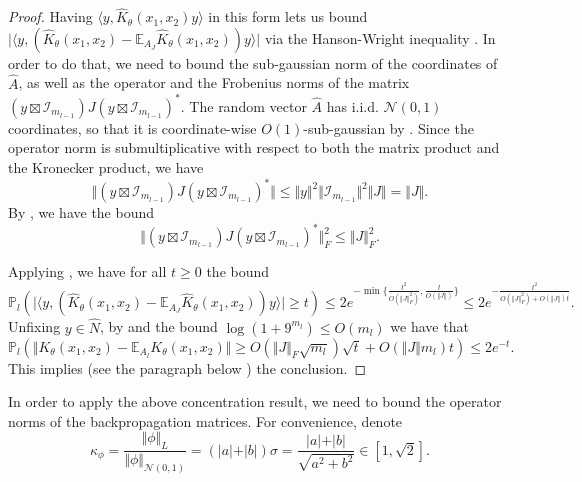 \documentclass[twoside,11pt]{article}
\newcommand{\E}{\mathbb{E}}
\newcommand{\Prob}{\mathbb{P}}
\newcommand{\Id}{\mathcal{I}}
\begin{document}
\begin{proof}
Having $\langle y, \hat{K}_\theta(x_1,x_2) y \rangle$ in this form lets us bound $\vert \langle y, (\hat{K}_\theta(x_1,x_2) - \E_{A_J} \hat{K}_\theta(x_1,x_2)) y \rangle \vert$ via the Hanson-Wright inequality \citep[Theorem~6.2.1]{Vershynin2018}. In order to do that, we need to bound the sub-gaussian norm of the coordinates of $\hat{A}$, as well as the operator and the Frobenius norms of the matrix $(y \boxtimes \Id_{m_{l-1}}) J (y \boxtimes \Id_{m_{l-1}})^*$. The random vector $\hat{A}$ has i.i.d. $\mathcal{N}(0,1)$ coordinates, so that it is coordinate-wise $O(1)$-sub-gaussian by \citep[Example~2.5.8 (i)]{Vershynin2018}. Since the operator norm is submultiplicative with respect to both the matrix product and the Kronecker product, we have
\[
\Vert (y \boxtimes \Id_{m_{l-1}}) J (y \boxtimes \Id_{m_{l-1}})^* \Vert
\leq \Vert y \Vert^2 \Vert \Id_{m_{l-1}} \Vert^2 \Vert J \Vert = \Vert J \Vert.
\]
By \citet[Exercise~6.3.3]{Vershynin2018}, we have the bound
\[
\Vert (y \boxtimes \Id_{m_{l-1}}) J (y \boxtimes \Id_{m_{l-1}})^* \Vert_F^2
\leq \Vert J \Vert_F^2.
\]

Applying \citet[Theorem~6.2.1]{Vershynin2018}, we have for all $t \geq 0$ the bound
\[
\Prob_l(\vert \langle y, (\hat{K}_\theta(x_1,x_2) - \E_{A_J} \hat{K}_\theta(x_1,x_2)) y \rangle \vert \geq t)
\leq 2e^{-\min\{ \frac{t^2}{O(\Vert J \Vert_F^2)}, \frac{t}{O(\Vert J \Vert)} \}} 
\leq 2e^{-\frac{t^2}{O(\Vert J \Vert_F^2) + O(\Vert J \Vert) t}}. 
\]
Unfixing $y \in \hat{N}$, by \citet[Lemma~2.2.13]{Vandervaartetal2023} and the bound $\log(1+9^{m_l}) \leq O(m_l)$ we have that
\[
\Prob_l\left( \Vert K_\theta(x_1,x_2) - \E_{A_l} K_\theta(x_1,x_2) \Vert \geq O(\Vert J \Vert_F \sqrt{m_l}) \sqrt{t} + O(\Vert J \Vert m_l) t \right)
\leq 2e^{-t}.
\]
This implies (see the paragraph below \citet[Example~2.2.12]{Vandervaartetal2023}) the conclusion.
\end{proof}

In order to apply the above concentration result, we need to bound the operator norms of the backpropagation matrices. For convenience, denote
\[
\kappa_\phi = \frac{\Vert \phi \Vert_L}{\Vert \phi \Vert_{\mathcal{N}(0,1)}} = (\vert a \vert + \vert b \vert) \sigma = \frac{\vert a \vert + \vert b \vert}{\sqrt{a^2 + b^2}} \in \left[ 1, \sqrt{2} \right].
\]
\end{document}
